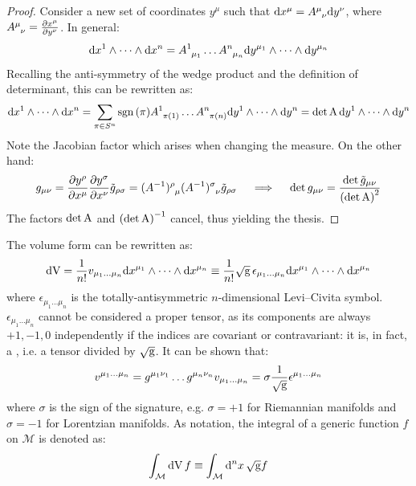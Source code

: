 \begin{proofbox}
  \begin{proof}
    Consider a new set of coordinates $ y^{\mu} $ such that $ \dd x^{\mu} = \tensor{A}{^\mu _\nu} \dd y^{\nu} $, where $ \tensor{A}{^\mu _\nu} = \frac{\pa x^{\mu}}{\pa y^{\nu}} $. In general:
    \begin{equation*}
      \dd x^1 \wedge \dots \wedge \dd x^n = \tensor{A}{^1 _{\mu_1}} \dots \tensor{A}{^n _{\mu_n}} \dd y^{\mu_1} \wedge \dots \wedge \dd y^{\mu_n}
    \end{equation*}
    Recalling the anti-symmetry of the wedge product and the definition of determinant, this can be rewritten as:
    \begin{equation*}
      \dd x^1 \wedge \dots \wedge \dd x^n = \sum_{\pi \in S^n} \sgn(\pi) \tensor{A}{^1 _{\pi(1)}} \dots \tensor{A}{^n _{\pi(n)}} \dd y^1 \wedge \dots \wedge \dd y^n = \det \mt{A} \, \dd y^1 \wedge \dots \wedge \dd y^n
    \end{equation*}
    Note the Jacobian factor which arises when changing the measure. On the other hand:
    \begin{equation*}
      g_{\mu \nu} = \frac{\pa y^{\rho}}{\pa x^{\mu}} \frac{\pa y^{\sigma}}{\pa x^{\nu}} \tilde{g}_{\rho \sigma} = \tensor{(A^{-1})}{^\rho _\mu} \tensor{(A^{-1})}{^\sigma _\nu} \tilde{g}_{\rho \sigma}
      \quad \implies \quad
      \det g_{\mu \nu} = \frac{\det \tilde{g}_{\mu \nu}}{\left( \det \mt{A} \right)^2}
    \end{equation*}
    The factors $ \det \mathrm{A} $ and $ \left( \det \mathrm{A} \right)^{-1} $ cancel, thus yielding the thesis.
  \end{proof}
\end{proofbox}

The volume form can be rewritten as:
\begin{equation}
  \mathrm{d} \mathrm{V} = \frac{1}{n!} v_{\mu_1 \dots \mu_n} \mathrm{d} x^{\mu_1} \wedge \dots \wedge \mathrm{d} x^{\mu_n} \equiv \frac{1}{n!} \sqrt{\mathrm{g}}\, \epsilon_{\mu_1 \dots \mu_n} \mathrm{d} x^{\mu_1} \wedge \dots \wedge \mathrm{d} x^{\mu_n}
\end{equation}
where $ \epsilon_{\mu_1 \dots \mu_n} $ is the totally-antisymmetric $ n $-dimensional Levi--Civita symbol. $ \epsilon_{\mu_1 \dots \mu_n} $ cannot be considered a proper tensor, as its components are always $ +1,-1,0 $ independently if the indices are covariant or contravariant: it is, in fact, a , i.e. a tensor divided by $ \sqrt{\mathrm{g}} $. It can be shown that:
\begin{equation}
  v^{\mu_1 \dots \mu_n} = g^{\mu_1 \nu_1} \dots g^{\mu_n \nu_n} v_{\mu_1 \dots \mu_n} = \sigma \frac{1}{\sqrt{\mathrm{g}}} \epsilon^{\mu_1 \dots \mu_n}
\end{equation}
where $ \sigma $ is the sign of the signature, e.g. $ \sigma = +1 $ for Riemannian manifolds and $ \sigma = -1 $ for Lorentzian manifolds.
As notation, the integral of a generic function $ f $ on $ \mathcal{M} $ is denoted as:
\begin{equation}
  \int_{\mathcal{M}} \mathrm{d} \mathrm{V} \, f \equiv \int_{\mathcal{M}} \mathrm{d}^n x \,\sqrt{\mathrm{g}} f
\end{equation}

